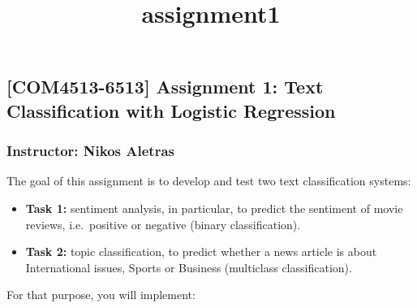 \documentclass[11pt]{article}
\title{assignment1}
\providecommand{\tightlist}{%
      \setlength{\itemsep}{0pt}\setlength{\parskip}{0pt}}
\begin{document}
    \maketitle




    \hypertarget{com4513-6513-assignment-1-text-classification-with-logistic-regression}{%
\subsection{{[}COM4513-6513{]} Assignment 1: Text Classification with
Logistic
Regression}\label{com4513-6513-assignment-1-text-classification-with-logistic-regression}}

\hypertarget{instructor-nikos-aletras}{%
\subsubsection{Instructor: Nikos
Aletras}\label{instructor-nikos-aletras}}

The goal of this assignment is to develop and test two text
classification systems:

\begin{itemize}
\tightlist
\item
  \textbf{Task 1:} sentiment analysis, in particular, to predict the
  sentiment of movie reviews, i.e.~positive or negative (binary
  classification).
\item
  \textbf{Task 2:} topic classification, to predict whether a news
  article is about International issues, Sports or Business (multiclass
  classification).
\end{itemize}

For that purpose, you will implement:
\end{document}
